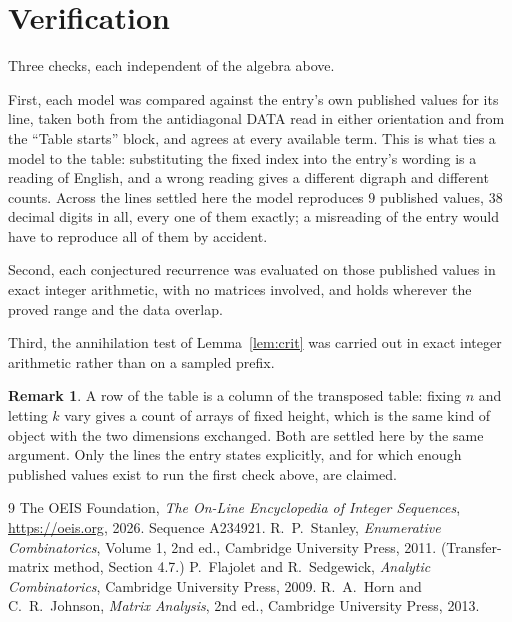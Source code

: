 \documentclass[11pt,a4paper]{article}
\theoremstyle{plain}
\theoremstyle{definition}
\newtheorem{remark}[theorem]{Remark}
\begin{document}
\section{Verification}

Three checks, each independent of the algebra above.

First, each model was compared against the entry's own published values for its line, taken
both from the antidiagonal DATA read in either orientation and from the ``Table starts''
block, and agrees at every available term. This is what ties a model to the table:
substituting the fixed index into the entry's wording is a reading of English, and a wrong
reading gives a different digraph and different counts. Across the lines settled here the
model reproduces $9$ published values, $38$ decimal digits in all, every one of
them exactly; a misreading of the entry would have to reproduce all of them by accident.

Second, each conjectured recurrence was evaluated on those published values in exact
integer arithmetic, with no matrices involved, and holds wherever the proved range and the
data overlap.

Third, the annihilation test of Lemma~\ref{lem:crit} was carried out in exact integer
arithmetic rather than on a sampled prefix.

\begin{remark}
A row of the table is a column of the transposed table: fixing $n$ and letting $k$ vary gives a
count of arrays of fixed height, which is the same kind of object with the two dimensions
exchanged. Both are settled here by the same argument. Only the lines the entry states
explicitly, and for which enough published values exist to run the first check above, are
claimed.
\end{remark}

\begin{thebibliography}{9}
 The OEIS Foundation, \emph{The On-Line Encyclopedia of Integer
Sequences}, \url{https://oeis.org}, 2026. Sequence A234921.
 R.~P.~Stanley, \emph{Enumerative Combinatorics}, Volume 1, 2nd ed.,
Cambridge University Press, 2011. (Transfer-matrix method, Section 4.7.)
 P.~Flajolet and R.~Sedgewick, \emph{Analytic Combinatorics}, Cambridge
University Press, 2009.
 R.~A.~Horn and C.~R.~Johnson, \emph{Matrix Analysis}, 2nd ed., Cambridge
University Press, 2013.
\end{thebibliography}
\end{document}
